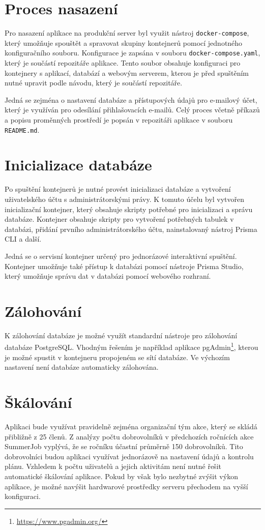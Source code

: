 \section{Proces nasazení}

Pro nasazení aplikace na produkční server byl využit nástroj \texttt{docker-compose}, který
umožňuje spouštět a spravovat skupiny kontejnerů pomocí jednotného konfiguračního souboru.
Konfigurace je zapsána v souboru \texttt{docker-compose.yaml}, který je součástí repozitáře aplikace.
Tento soubor obsahuje konfiguraci pro kontejnery s aplikací, databází a webovým serverem, kterou 
je před spuštěním nutné upravit podle návodu, který je součástí repozitáře.

Jedná se zejména o nastavení databáze a přístupových údajů pro e-mailový účet, který je využíván
pro odesílání přihlašovacích e-mailů. Celý proces včetně příkazů a popisu proměnných prostředí je popsán
v repozitáři aplikace v souboru \texttt{README.md}.

\section{Inicializace databáze}

Po spuštění kontejnerů je nutné provést inicializaci databáze
a vytvoření uživatelského účtu s administrátorskými právy. K tomuto účelu byl vytvořen inicializační kontejner, který
obsahuje skripty potřebné pro inicializaci a správu databáze. Kontejner obsahuje skripty pro vytvoření potřebných tabulek v databázi,
přidání prvního administrátorského účtu, nainstalovaný nástroj Prisma CLI a další.

Jedná se o servisní kontejner určený pro jednorázové interaktivní spuštění. Kontejner umožňuje také přístup k databázi
pomocí nástroje Prisma Studio, který umožňuje správu dat v databázi pomocí webového rozhraní. 

\section{Zálohování}

K zálohování databáze je možné využít standardní nástroje pro zálohování databáze PostgreSQL.
Vhodným řešením je například aplikace pgAdmin\footnote{\url{https://www.pgadmin.org/}}, kterou
je možné spustit v kontejneru propojeném se sítí databáze.
Ve výchozím nastavení není databáze automaticky zálohována.

\section{Škálování}

 Aplikaci bude využívat
pravidelně zejména organizační tým akce, který se skládá přibližně z 25 členů. Z analýzy počtu dobrovolníků v předchozích ročnících akce SummerJob vyplývá, že
se ročníku účastní průměrně 150 dobrovolníků. Tito dobrovolníci budou aplikaci využívat jednorázově na nastavení údajů a kontrolu plánu.
Vzhledem k počtu uživatelů a jejich aktivitám není nutné řešit automatické škálování aplikace. Pokud by však bylo nezbytné
zvýšit výkon aplikace, je možné navýšit hardwarové prostředky serveru přechodem na vyšší konfiguraci.
